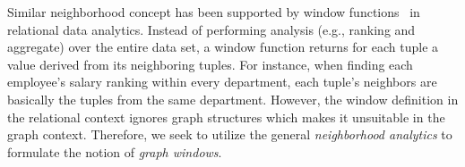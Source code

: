 
Similar neighborhood concept has been supported by window functions~\cite{cao2012optimization, bellamkonda2013adaptive} in relational data analytics.
Instead of performing analysis (e.g., ranking and aggregate) over the entire data set, 
a window function returns for each tuple a value derived from its neighboring tuples. 
For instance, when finding each employee's salary ranking within every department,
each tuple's neighbors are basically the tuples from the same department. 
However, the window definition in the relational context ignores graph structures
which makes it unsuitable in the graph context. Therefore,
we seek to utilize the general \emph{neighborhood analytics} to formulate
 the notion of \emph{graph windows}.

%
%
 
